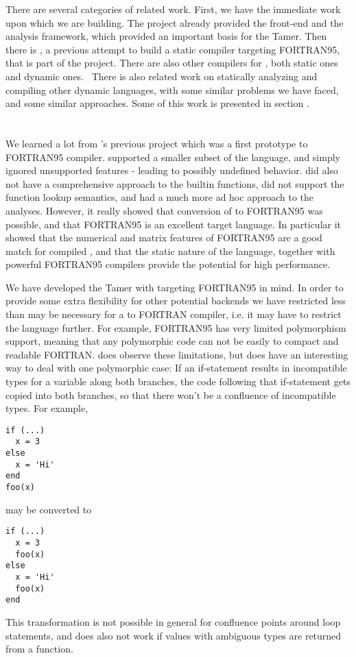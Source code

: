 There are several categories of related work.  First, we have the
immediate work upon which we are building.  The \mclab project already
provided the front-end and the \mcsaf\cite{JesseThesis} analysis
framework, which provided an important basis for the Tamer.  
Then there is \mcfor, a previous attempt to build a static
compiler targeting {\sc FORTRAN95}, that is part of the \mclab project.
There are also other compilers for \matlab, both static ones and
dynamic ones.
\
There is also related work on statically analyzing and compiling
other dynamic languages, with some similar problems we have faced,
and some similar approaches. Some of this work is presented
in section .

\section{\mcfor}

We learned a lot from \mclab's previous \mcfor project\cite{McForThesis}
which was a first prototype \matlab to {\sc FORTRAN95}
compiler.  \mcfor supported a smaller subset of the language, and
simply ignored unsupported features - leading to possibly undefined
behavior. \mcfor did also not have a comprehensive approach to the
builtin functions, did not support the \matlab function lookup semantics, and
had a much more ad hoc approach to the analyses.  However, it really
showed that conversion of \matlab to {\sc FORTRAN95} was possible, and
that {\sc FORTRAN95} is an excellent target language.
In particular it showed that the numerical and matrix features
of {\sc FORTRAN95} are a good match for compiled \matlab, and that
the static nature of the language, together with powerful
{\sc FORTRAN95} compilers provide the potential for high performance.

We have developed the Tamer with targeting {\sc FORTRAN95} in mind. In
order to provide some extra flexibility for other potential backends
we have restricted \matlab less than may be necessary for a \matlab to
{\sc FORTRAN} compiler, i.e. it may have to restrict the \matlab
language further. For example, {\sc FORTRAN95} has very limited
polymorphism support, meaning that any polymorphic code can not be
easily \rednote{translated} to compact and readable FORTRAN. \mcfor does observe
these limitations, but does have an interesting way to deal with one
polymorphic case: If an if-statement results in incompatible types for
a variable along both branches, the code following that if-statement
gets copied into both branches, so that there won't be a confluence of
incompatible types.  For example,
\vspace{-.5cm}
\begin{lstlisting}
if (...)
  x = 3
else
  x = 'Hi'
end
foo(x)
\end{lstlisting}
may be converted to
\vspace{-.5cm}
\begin{lstlisting}
if (...)
  x = 3
  foo(x)
else
  x = 'Hi'
  foo(x)
end
\end{lstlisting}
This transformation is not possible in general for confluence points around
loop statements, and does also not work if values with ambiguous types
are returned from a function.

